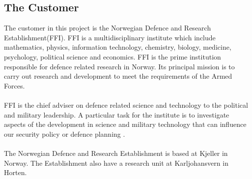 \subsection{The Customer}
The customer in this project is the Norwegian Defence and Research Establishment(FFI). FFI is a multidisciplinary institute which include mathematics, physics, information technology, chemistry, biology, medicine, psychology, political science and economics. FFI is the prime institution responsible for defence related research in Norway. Its principal mission is to carry out research and development to meet the requirements of the Armed Forces.
\\\\
FFI is the chief adviser on defence related science and technology to the political and military leadership. A particular task for the institute is to investigate aspects of the development in science and military technology that can influence our security policy or defence planning \cite{FFI}.
\\\\
The Norwegian  Defence and Research Establishment is based at Kjeller in Norway. The Establishment also have a research unit at Karljohansvern in Horten. 